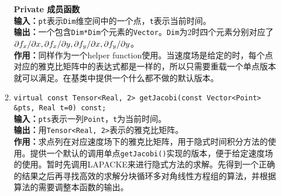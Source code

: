\documentclass[a4paper,twoside]{ctexart}
\begin{document}
\begin{itemize}
\begin{enumerate}[(1)]
                \textbf{Private 成员函数}\\
                \textbf{输入：}\texttt{pt}表示\texttt{Dim}维空间中的一个点，\texttt{t}表示当前时间。\\
                \textbf{输出：}一个包含\texttt{Dim*Dim}个元素的\texttt{Vector}。\texttt{Dim}为$2$时四个元素分别对应了$\partial f_x/\partial x, \\\partial f_x/\partial y, \partial f_y/\partial x, \partial f_y/\partial y$。\\
                \textbf{作用：}同样作为一个helper function使用。当速度场是给定的时，每个点对应的雅克比矩阵中的表达式都是一样的，所以只需要重载一个单点版本就可以满足。在基类中提供一个什么都不做的默认版本。
                \item \texttt{virtual const Tensor<Real, 2> getJacobi(const Vector<Point> \&pts, Real t=0) const;}\\
                \textbf{输入：}\texttt{pts}表示一列\texttt{Point}，\texttt{t}为当前时间。\\
                \textbf{输出：}用\texttt{Tensor<Real, 2>}表示的雅克比矩阵。\\
                \textbf{作用：}求点列在对应速度场下的雅克比矩阵，用于隐式时间积分方法的使用。提供一个默认的调用单点\texttt{getJacobi()}实现的版本，便于给定速度场的使用。暂时先调用LAPACKE来进行隐式方法的求解。先得到一个正确的结果之后再寻找高效的求解分块循环多对角线性方程组的算法，并根据算法的需要调整本函数的输出。
            \end{enumerate}
\end{itemize}
\end{document}
